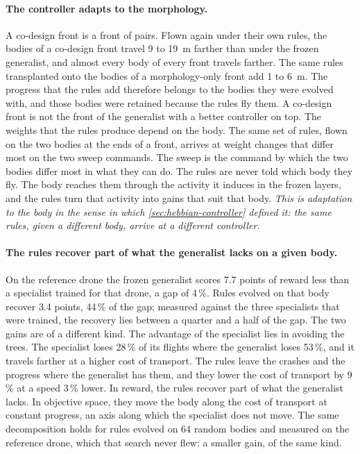 \paragraph{The controller adapts to the morphology.} A co-design front is a front of pairs. Flown again under their own rules, the bodies of a co-design front travel 9 to 19~m farther than under the frozen generalist, and almost every body of every front travels farther. The same rules transplanted onto the bodies of a morphology-only front add 1 to 6~m. The progress that the rules add therefore belongs to the bodies they were evolved with, and those bodies were retained because the rules fly them. A co-design front is not the front of the generalist with a better controller on top. The weights that the rules produce depend on the body. The same set of rules, flown on the two bodies at the ends of a front, arrives at weight changes that differ most on the two sweep commands. The sweep is the command by which the two bodies differ most in what they can do. The rules are never told which body they fly. The body reaches them through the activity it induces in the frozen layers, and the rules turn that activity into gains that suit that body. \emph{This is adaptation to the body in the sense in which \autoref{sec:hebbian-controller} defined it: the same rules, given a different body, arrive at a different controller.}

\paragraph{The rules recover part of what the generalist lacks on a given body.} On the reference drone the frozen generalist scores 7.7 points of reward less than a specialist trained for that drone, a gap of 4\,\%. Rules evolved on that body recover 3.4 points, 44\,\% of the gap; measured against the three specialists that were trained, the recovery lies between a quarter and a half of the gap. The two gains are of a different kind. The advantage of the specialist lies in avoiding the trees. The specialist loses 28\,\% of its flights where the generalist loses 53\,\%, and it travels farther at a higher cost of transport. The rules leave the crashes and the progress where the generalist has them, and they lower the cost of transport by 9\,\% at a speed 3\,\% lower. In reward, the rules recover part of what the generalist lacks. In objective space, they move the body along the cost of transport at constant progress, an axis along which the specialist does not move. The same decomposition holds for rules evolved on 64 random bodies and measured on the reference drone, which that search never flew: a smaller gain, of the same kind.

